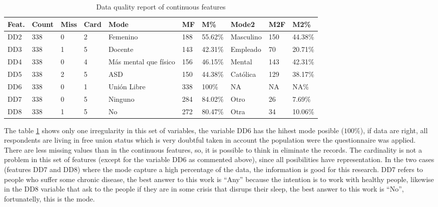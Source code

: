 \documentclass[]{book}
\begin{document}
\begin{table}[ht]
\centering
\caption{Data quality report of continuous features}
\label{Report-of-quality-of-the-categorical-demographic-features}
\begin{tabular}{llllp{2cm}llp{2cm}ll}
\hline
\textbf{Feat.} & \textbf{Count} & \textbf{Miss} & \textbf{Card} & \textbf{Mode}         & \textbf{MF} & \textbf{M\%} & \textbf{Mode2} & \textbf{M2F} & \textbf{M2\%} \\ \hline
DD2              & 338            & 0             & 2             & Femenino              & 188               & 55.62\%           & Masculino      & 150                & 44.38\%            \\
DD3              & 338            & 1             & 5             & Docente               & 143               & 42.31\%           & Empleado       & 70                 & 20.71\%            \\
DD4              & 338            & 0             & 4             & Más mental que físico & 156               & 46.15\%           & Mental         & 143                & 42.31\%            \\
DD5              & 338            & 2             & 5             & ASD                   & 150               & 44.38\%           & Católica       & 129                & 38.17\%            \\
DD6              & 338            & 0             & 1             & Unión Libre           & 338               & 100\%             & NA             & NA                 & NA\%               \\
DD7              & 338            & 0             & 5             & Ninguno               & 284               & 84.02\%           & Otro           & 26                 & 7.69\%             \\
DD8              & 338            & 1             & 5             & No                    & 272               & 80.47\%           & Otra           & 34                 & 10.06\%            \\ \hline
\end{tabular}
\end{table}

The table
\ref{Report-of-quality-of-the-categorical-demographic-features} shows
only one irregularity in this set of variables, the variable DD6 has the
hihest mode posible (\(100\%\)), if data are right, all respondents are
living in free union status which is very doubtful taken in account the
population were the questionnaire was applied. There are less missing
values than in the continuous features, so, it is possible to think in
eliminate the records. The cardinality is not a problem in this set of
features (except for the variable DD6 as commented above), since all
posibilities have representation. In the two cases (features DD7 and
DD8) where the mode capture a high percentage of the data, the
information is good for this research. DD7 refers to people who suffer
some chronic disease, the best answer to this work is ``Any'' because
the intention is to work with healthy people, likewise in the DD8
variable that ask to the people if they are in some crisis that disrups
their sleep, the best answer to this work is ``No'', fortunatelly, this
is the mode.
\end{document}
